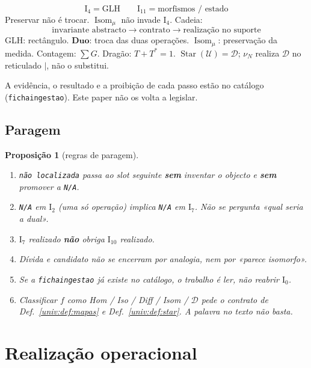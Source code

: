 \documentclass[11pt,a4paper]{article}
\newtheorem{proposicao}[teorema]{Proposição}
\begin{document}
\[
\boxed{\;\mathrm{I}_{4}=\mathrm{GLH}
\qquad
\mathrm{I}_{11}=\text{morfismos / estado}\;}
\]
Preservar não é trocar. \(\operatorname{Isom}_{\mu}\) não invade
\(\mathrm{I}_{4}\). Cadeia:
\[
\boxed{\;
\text{invariante abstracto}
\to
\text{contrato}
\to
\text{realização no suporte}
\;}
\]
GLH: rectângulo. \(\mathbf{Duo}\): troca das duas operações.
\(\operatorname{Isom}_{\mu}\): preservação da medida. Contagem:
\(\sum G\). Dragão: \(T+T^{*}=1\).
\(\operatorname{Star}(\mathcal{U})=\mathcal{D}\); \(\nu_N\) realiza
\(\mathcal{D}\) no reticulado \(\mid\), não o substitui.

A evidência, o resultado e a proibição de cada passo estão no catálogo
(\texttt{fichaingestao}). Este paper não os volta a legislar.

\subsection*{Paragem}

\begin{proposicao}[regras de paragem]\label{univ:prop:paragem}
\begin{enumerate}\itemsep2pt
\item \texttt{não localizada} passa ao slot seguinte \textbf{sem} inventar
o objecto e \textbf{sem} promover a \texttt{N/A}.
\item \texttt{N/A} em \(\mathrm{I}_{2}\) (uma só operação) implica
\texttt{N/A} em \(\mathrm{I}_{7}\). Não se pergunta «qual seria a dual».
\item \(\mathrm{I}_{7}\) realizado \textbf{não} obriga \(\mathrm{I}_{10}\)
realizado.
\item Dívida e candidato não se encerram por analogia, nem por «parece
isomorfo».
\item Se a \texttt{fichaingestao} já existe no catálogo, o trabalho é ler,
não reabrir \(\mathrm{I}_{0}\).
\item Classificar \(f\) como Hom / Iso / Diff / Isom / \(\mathcal{D}\)
pede o contrato de Def.~\ref{univ:def:mapas} e Def.~\ref{univ:def:star}.
A palavra no texto não basta.
\end{enumerate}
\end{proposicao}

\section{Realização operacional}\label{univ:sec:realizacao-op}
\end{document}
